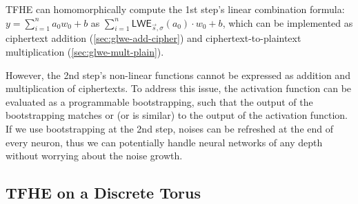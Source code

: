 TFHE can homomorphically compute the 1st step's linear combination formula: $y = \sum\limits_{i=1}^{n}a_0w_0 + b$ as $\sum\limits_{i=1}^{n}\textsf{LWE}_{\vec{s}, \sigma}(a_0) \cdot w_0 + b$, which can be implemented as ciphertext addition (\autoref{sec:glwe-add-cipher}) and ciphertext-to-plaintext multiplication (\autoref{sec:glwe-mult-plain}). 

However, the 2nd step's non-linear functions cannot be expressed as addition and multiplication of ciphertexts. To address this issue, the activation function can be evaluated as a programmable bootstrapping, such that the output of the bootstrapping matches or (or is similar) to the output of the activation function. If we use bootstrapping at the 2nd step, noises can be refreshed at the end of every neuron, thus we can potentially handle neural networks of any depth without worrying about the noise growth.



\subsection{TFHE on a Discrete Torus}
\label{subsec:torus}
